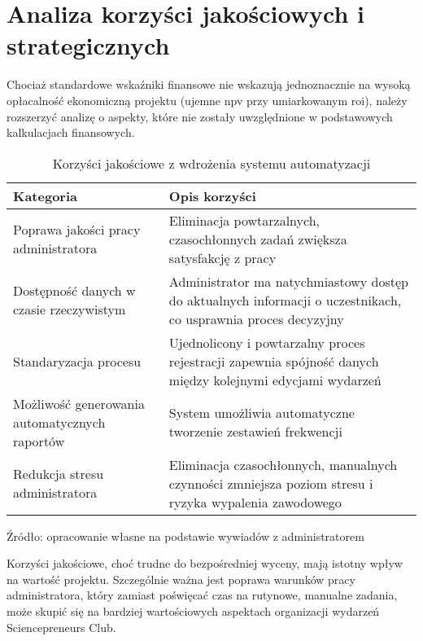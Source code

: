 \section{Analiza korzyści jakościowych i strategicznych}

Chociaż standardowe wskaźniki finansowe nie wskazują jednoznacznie na wysoką opłacalność ekonomiczną projektu (ujemne \gls{npv} przy umiarkowanym \gls{roi}), należy rozszerzyć analizę o aspekty, które nie zostały uwzględnione w podstawowych kalkulacjach finansowych.

\begin{table}[ht]
    \centering
    \caption[Korzyści jakościowe z wdrożenia systemu automatyzacji, źródło: opracowanie własne na podstawie wywiadów z administratorem]{Korzyści jakościowe z wdrożenia systemu automatyzacji}
    \renewcommand{\arraystretch}{1.3} %
    \begin{tabular}{| p{} | p{} |}
        \hline
        \textbf{Kategoria} & \textbf{Opis korzyści} \\
        \hline
        Poprawa jakości pracy administratora & Eliminacja powtarzalnych, czasochłonnych zadań zwiększa satysfakcję z pracy \\
        \hline
        Dostępność danych w czasie rzeczywistym & Administrator ma natychmiastowy dostęp do aktualnych informacji o uczestnikach, co usprawnia proces decyzyjny \\
        \hline
        Standaryzacja procesu & Ujednolicony i powtarzalny proces rejestracji zapewnia spójność danych między kolejnymi edycjami wydarzeń \\
        \hline
        Możliwość generowania automatycznych raportów & System umożliwia automatyczne tworzenie zestawień frekwencji \\
        \hline
        Redukcja stresu administratora & Eliminacja czasochłonnych, manualnych czynności zmniejsza poziom stresu i ryzyka wypalenia zawodowego \\
        \hline
    \end{tabular}
    \vspace{0.5em}
    \par\raggedright\footnotesize{Źródło: opracowanie własne na podstawie wywiadów z administratorem}
\end{table}

Korzyści jakościowe, choć trudne do bezpośredniej wyceny, mają istotny wpływ na wartość projektu. Szczególnie ważna jest poprawa warunków pracy administratora, który zamiast poświęcać czas na rutynowe, manualne zadania, może skupić się na bardziej wartościowych aspektach organizacji wydarzeń Sciencepreneurs Club. 

